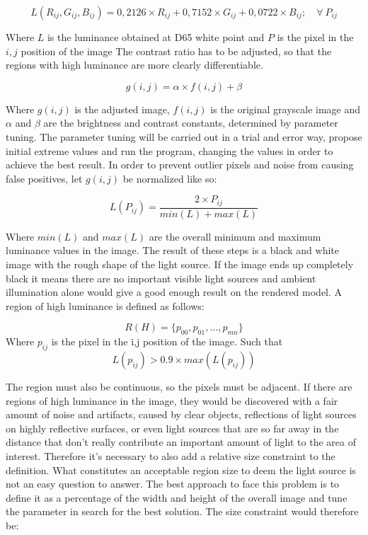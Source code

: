 \begin{equation}
    L(R_{ij},G_{ij},B_{ij}) = 0,2126 \times R_{ij} + 0,7152 \times G_{ij} + 0,0722 \times B_{ij}; \quad \forall \  P_{ij}
\end{equation}

Where $L$ is the luminance obtained at D65 white point and $P$ is the pixel in the $i,j$ position of the image \newline
The contrast ratio has to be adjusted, so that the regions with high luminance are more clearly differentiable. 

\begin{equation}
     g(i,j) = \alpha \times f(i,j) + \beta
\end{equation}

Where $g(i,j)$ is the adjusted image, $f(i,j)$ is the original grayscale image and $\alpha$ and $\beta$ are the brightness and contrast constants, determined by parameter tuning. The parameter tuning will be carried out in a trial and error way, propose initial extreme values and run the program, changing the values in order to achieve the best result.
In order to prevent outlier pixels and noise from causing false positives, let $g(i,j)$ be normalized like so:

\begin{equation}
    L(P_{ij}) = \frac{ 2 \times P_{ij} }{min(L) + max(L)}
\end{equation}

Where $min(L)$ and $max(L)$ are the overall minimum and maximum luminance values in the image. 
\newline
The result of these steps is a black and white image with the rough shape of the light source. If the image ends up completely black it means there are no important visible light sources and ambient illumination alone would give a good enough result on the rendered model. A region of high luminance is defined as follows:

\begin{equation}
    R(H) = \{p_{00}, p_{01}, ... , p_{mn}\}
\end{equation}
 Where $p_{ij}$ is the pixel in the i,j position of the image. Such that 
\[
    L(p_{ij}) > 0.9 \times max(L(p_{ij})) 
\]

The region must also be continuous, so the pixels must be adjacent.\newline
If there are regions of high luminance in the image, they would be discovered with a fair amount of noise and artifacts, caused by clear objects, reflections of light sources on highly reflective surfaces, or even light sources that are so far away in the distance that don't really contribute an important amount of light to the area of interest. Therefore it's necessary to also add a relative size constraint to the definition. What constitutes an acceptable region size to deem the light source is not an easy question to answer. The best approach to face this problem is to define it as a percentage of the width and height of the overall image and tune the parameter in search for the best solution. The size constraint would therefore be:


